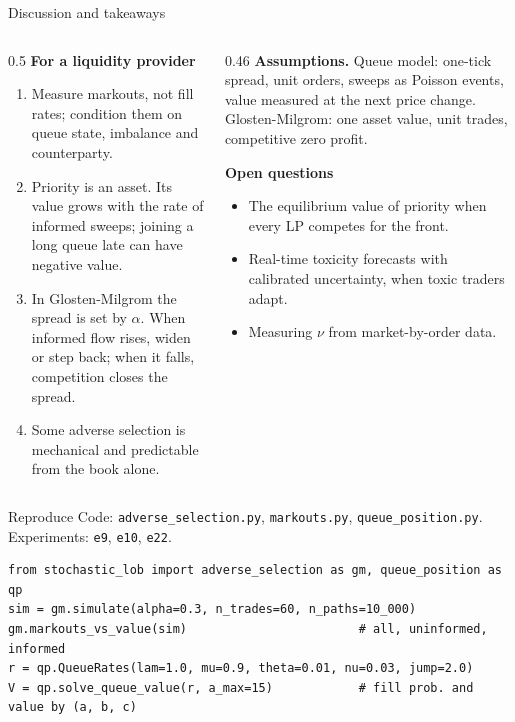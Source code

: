 \documentclass[aspectratio=169,10pt]{beamer}
\begin{document}
\begin{frame}{Discussion and takeaways}
  \small
  \begin{columns}[T]
    \begin{column}{0.5\textwidth}
      \textbf{For a liquidity provider}
      \begin{enumerate}
        \item Measure markouts, not fill rates; condition them on queue state, imbalance and counterparty.
        \item Priority is an asset. Its value grows with the rate of informed sweeps; joining a long queue late can have negative value.
        \item In Glosten-Milgrom the spread is set by $\alpha$. When informed flow rises, widen or step back; when it falls, competition closes the spread.
        \item Some adverse selection is mechanical and predictable from the book alone.
      \end{enumerate}
    \end{column}
    \begin{column}{0.46\textwidth}
      \textbf{Assumptions.} Queue model: one-tick spread, unit orders, sweeps as Poisson events, value measured at the next price change. Glosten-Milgrom: one asset value, unit trades, competitive zero profit.

      \vspace{0.3em}
      \textbf{Open questions}
      \begin{itemize}
        \item The equilibrium value of priority when every LP competes for the front.
        \item Real-time toxicity forecasts with calibrated uncertainty, when toxic traders adapt.
        \item Measuring $\nu$ from market-by-order data.
      \end{itemize}
    \end{column}
  \end{columns}
\end{frame}

\begin{frame}[fragile]{Reproduce}
  \small
  Code: \texttt{adverse\_selection.py}, \texttt{markouts.py}, \texttt{queue\_position.py}. Experiments: \texttt{e9}, \texttt{e10}, \texttt{e22}.
\begin{verbatim}
from stochastic_lob import adverse_selection as gm, queue_position as qp
sim = gm.simulate(alpha=0.3, n_trades=60, n_paths=10_000)
gm.markouts_vs_value(sim)                        # all, uninformed, informed
r = qp.QueueRates(lam=1.0, mu=0.9, theta=0.01, nu=0.03, jump=2.0)
V = qp.solve_queue_value(r, a_max=15)            # fill prob. and value by (a, b, c)
\end{verbatim}
\end{frame}

\deckreferences
\end{document}
